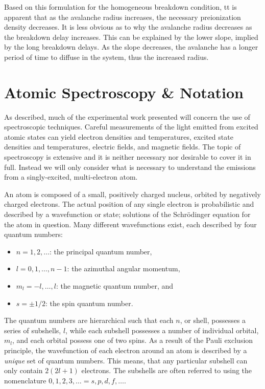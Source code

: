 Based on this formulation for the homogeneous breakdown condition, tt is
apparent that as the avalanche radius increases, the necessary preionization
density decreases. It is less obvious as to why the avalanche radius decreases
as the breakdown delay increases. This can be explained by the lower slope,
implied by the long breakdown delays. As the slope decreases, the avalanche has
a longer period of time to diffuse in the system, thus the increased radius.

\section{Atomic Spectroscopy \& Notation}

As described, much of the experimental work presented will concern the use of
spectroscopic techniques. Careful measurements of the light emitted from excited
atomic states can yield electron densities and temperatures, excited state
densities and temperatures, electric fields, and magnetic fields. The topic of
spectroscopy is extensive and it is neither necessary nor desirable to cover it
in full. Instead we will only consider what is necessary to understand the
emissions from a singly-excited, multi-electron atom.

An atom is composed of a small, positively charged nucleus, orbited by
negatively charged electrons. The actual position of any single electron is
probabilistic and described by a wavefunction or state; solutions of the
Schr\"{o}dinger equation for the atom in question. Many different wavefunctions
exist, each described by four quantum numbers:
\begin{itemize}
  \item $n=1,2,\ldots$: the principal quantum number,
  \item $l=0,1,\ldots,n-1$: the azimuthal angular momentum,
  \item $m_l =-l,\ldots,l$: the magnetic quantum number, and
  \item $s=\pm1/2$: the spin quantum number.
\end{itemize}
The quantum numbers are hierarchical such that each $n$, or shell, possesses a
series of subshells, $l$, while each subshell possesses a number of individual
orbital, $m_l$, and each orbital possess one of two spins. As a result of the
Pauli exclusion principle, the wavefunction of each electron around an atom is
described by a \emph{unique} set of quantum numbers. This means, that any
particular subshell can only contain $2(2l+1)$ electrons. The subshells are
often referred to using the nomenclature $0,1,2,3,\ldots = s,p,d,f,\ldots$.

